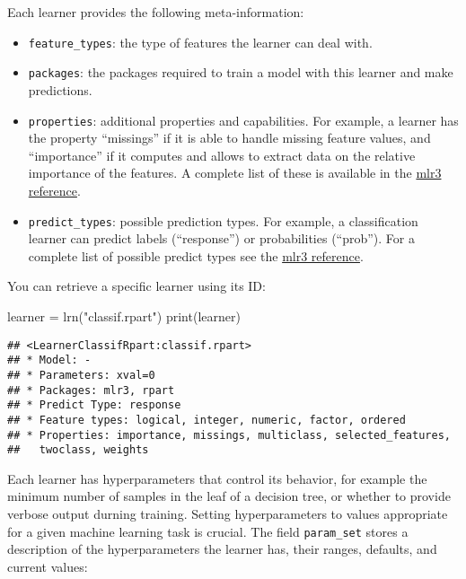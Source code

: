 \documentclass[
]{scrbook}
\newenvironment{Shaded}{\begin{snugshade}}{\end{snugshade}}
\newcommand{\FunctionTok}[1]{\textcolor[rgb]{0.00,0.00,0.00}{#1}}
\newcommand{\NormalTok}[1]{#1}
\newcommand{\OtherTok}[1]{\textcolor[rgb]{0.56,0.35,0.01}{#1}}
\newcommand{\StringTok}[1]{\textcolor[rgb]{0.31,0.60,0.02}{#1}}
\providecommand{\tightlist}{%
  \setlength{\itemsep}{0pt}\setlength{\parskip}{0pt}}
\renewenvironment{Shaded} {\begin{snugshade}\small} {\end{snugshade}}
\begin{document}
Each learner provides the following meta-information:

\begin{itemize}
\tightlist
\item
  \texttt{feature\_types}: the type of features the learner can deal with.
\item
  \texttt{packages}: the packages required to train a model with this learner and make predictions.
\item
  \texttt{properties}: additional properties and capabilities.
  For example, a learner has the property ``missings'' if it is able to handle missing feature values, and ``importance'' if it computes and allows to extract data on the relative importance of the features.
  A complete list of these is available in the \href{https://mlr3.mlr-org.com/reference/mlr_reflections.html\#examples}{mlr3 reference}.
\item
  \texttt{predict\_types}: possible prediction types. For example, a classification learner can predict labels (``response'') or probabilities (``prob''). For a complete list of possible predict types see the \href{https://mlr3.mlr-org.com/reference/mlr_reflections.html\#examples}{mlr3 reference}.
\end{itemize}

You can retrieve a specific learner using its ID:

\begin{Shaded}
\begin{Highlighting}[]
\NormalTok{learner }\OtherTok{=} \FunctionTok{lrn}\NormalTok{(}\StringTok{"classif.rpart"}\NormalTok{)}
\FunctionTok{print}\NormalTok{(learner)}
\end{Highlighting}
\end{Shaded}

\begin{verbatim}
## <LearnerClassifRpart:classif.rpart>
## * Model: -
## * Parameters: xval=0
## * Packages: mlr3, rpart
## * Predict Type: response
## * Feature types: logical, integer, numeric, factor, ordered
## * Properties: importance, missings, multiclass, selected_features,
##   twoclass, weights
\end{verbatim}

Each learner has hyperparameters that control its behavior, for example the minimum number of samples in the leaf of a decision tree, or whether to provide verbose output durning training.
Setting hyperparameters to values appropriate for a given machine learning task is crucial.
The field \texttt{param\_set} stores a description of the hyperparameters the learner has, their ranges, defaults, and current values:
\end{document}
